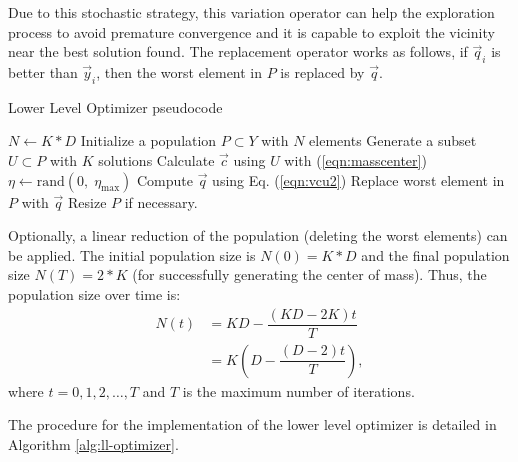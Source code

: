 \documentclass[conference]{IEEEtran}
\begin{document}
Due to this stochastic strategy, this variation operator can help the exploration
process to avoid premature convergence and it is capable to exploit the vicinity
near the best solution found. The replacement operator works as follows, if $\vec{q}_i$
is better than $\vec{y}_i$, then the worst element in $P$ is replaced by $\vec{q}$.

\begin{algorithm}[b]
    \caption{Lower Level Optimizer pseudocode}
    \label{alg:ll-optimizer}
    \begin{algorithmic}[1]
        \STATE $N \gets K*D$
        \STATE Initialize a population $P \subset Y$ with $N$ elements
                \STATE Generate a subset $U \subset P$ with $K$ solutions
                \STATE Calculate $\vec{c}$ using $U$ with (\ref{eqn:masscenter})
                \STATE $\eta \gets \text{rand}(0,\; \eta_{\max}) $ 
                \STATE Compute $\vec{q}$ using Eq. (\ref{eqn:vcu2})
                    \STATE Replace worst element in $P$ with $\vec{q}$
                \ENDIF
            \ENDFOR
            \STATE Resize $P$ if necessary.
        \ENDWHILE
    \end{algorithmic}
\end{algorithm}

Optionally, a linear reduction of the population (deleting the worst elements) can
be applied. The initial population size is $ N(0) = K*D$ and the final population
size $N(T) =  2*K$ (for successfully generating the center of mass). Thus, the
population size over time is:
\begin{align}
    N(t) &= KD - \dfrac{(KD - 2K)  t}{T} \\ \nonumber
         &= K \left( D - \dfrac{(D - 2)  t}{T} \right),
\end{align}
% 
where $t = 0,1,2,\ldots,T$ and $T$ is the maximum number of iterations.

The procedure for the implementation of the lower level optimizer is detailed in
Algorithm \ref{alg:ll-optimizer}.
% 





\end{document}
